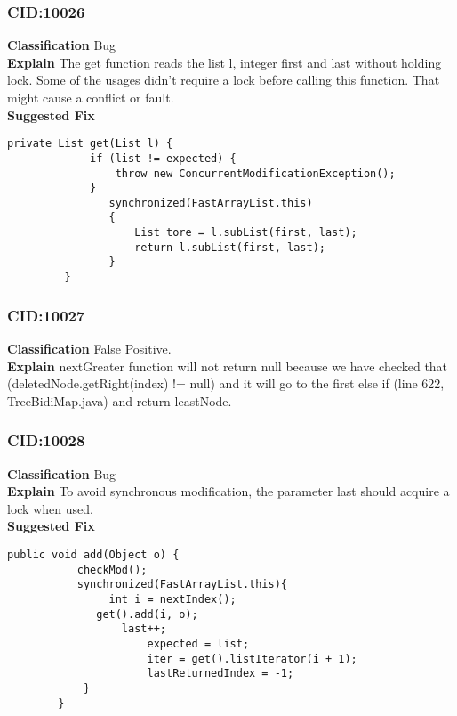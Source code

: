 \documentclass[10pt]{article}
\begin{document}
\subsubsection{CID:10026}
\textbf{Classification}
Bug
\\\textbf{Explain} 
The get function reads the list l, integer first and last without holding lock. Some of the usages didn't require a lock before calling this function. That might cause a conflict or fault. 
\\\textbf{Suggested Fix}
\begin{verbatim}
private List get(List l) {
             if (list != expected) {
                 throw new ConcurrentModificationException();
             }
             	synchronized(FastArrayList.this)
             	{
            		List tore = l.subList(first, last);
             		return l.subList(first, last);
             	}
         }
\end{verbatim}

\subsubsection{CID:10027}
\textbf{Classification}
False Positive.
\\\textbf{Explain} 
nextGreater function will not return null because we have checked that (deletedNode.getRight(index) != null) and it will go to the first else if (line 622, TreeBidiMap.java) and return leastNode.

\subsubsection{CID:10028}
\textbf{Classification}
Bug
\\\textbf{Explain}
To avoid synchronous modification, the parameter last should acquire a lock when used.
\\\textbf{Suggested Fix}
\begin{verbatim}
public void add(Object o) {
           checkMod();
           synchronized(FastArrayList.this){
    	        int i = nextIndex();
  	          get().add(i, o);
        		  last++;
        	    	  expected = list;
        	    	  iter = get().listIterator(i + 1);
        	    	  lastReturnedIndex = -1;
            }
        }
\end{verbatim}
\end{document}
